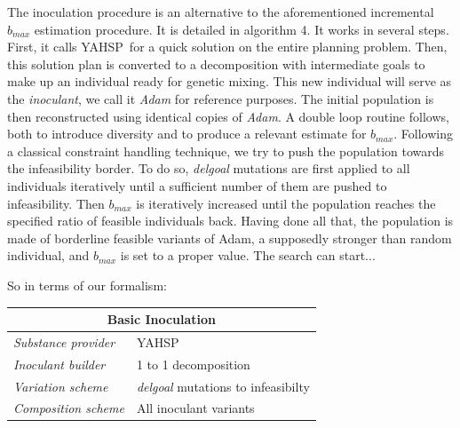 \documentclass[english]{DESCARWINreport}
\newcommand{\YAHSP}{{\sc YAHSP}}
\begin{document}
The inoculation procedure is an alternative to the aforementioned incremental {$b_{max}$} estimation procedure. It is detailed in algorithm 4. It works in several steps. First, it calls \YAHSP\ for a quick solution on the entire planning problem. Then, this solution plan is converted to a decomposition with intermediate goals to make up an individual ready for genetic mixing. This new individual will serve as the \emph{inoculant}, we call it \emph{Adam} for reference purposes. The initial population is then reconstructed using identical copies of \emph{Adam}. A double loop routine follows, both to introduce diversity and to produce a relevant estimate for {$b_{max}$}. Following a classical constraint handling technique, we try to push the population towards the infeasibility border. To do so, \emph{delgoal} mutations are first applied to all individuals iteratively until a sufficient number of them are pushed to infeasibility. Then {$b_{max}$} is iteratively increased until the population reaches the specified ratio of feasible individuals back. Having done all that, the population is made of borderline feasible variants of Adam, a supposedly stronger than random individual, and {$b_{max}$} is set to a proper value. The search can start...

So in terms of our formalism:

\begin{center}
\begin{tabular}{|l|l|}
  \hline
  \multicolumn{2}{|c|}{\bf Basic Inoculation} \\
  \hline
  \emph{Substance provider} & YAHSP \\
  \emph{Inoculant builder} & 1 to 1 decomposition \\
	\emph{Variation scheme} & \emph{delgoal} mutations to infeasibilty \\
	\emph{Composition scheme} & All inoculant variants \\
  \hline
\end{tabular}
\end{center}

\begin{algorithm}[h!]
\caption{$estimate b_{max} incremental$}
{\small
\begin{algorithmic}[1]


\ENDIF
\ENDFOR
{}
\ENDWHILE

\end{algorithmic}
}
\end{algorithm}
\end{document}
